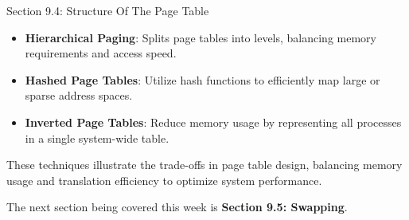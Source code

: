\begin{notes}{Section 9.4: Structure Of The Page Table}
\begin{highlight}
    \end{highlight}

    \begin{highlight}

        \begin{itemize}
            \item \textbf{Hierarchical Paging}: Splits page tables into levels, balancing memory requirements and access speed.
            \item \textbf{Hashed Page Tables}: Utilize hash functions to efficiently map large or sparse address spaces.
            \item \textbf{Inverted Page Tables}: Reduce memory usage by representing all processes in a single system-wide table.
        \end{itemize}

    These techniques illustrate the trade-offs in page table design, balancing memory usage and translation efficiency to optimize system performance.

    \end{highlight}
\end{notes}

The next section being covered this week is \textbf{Section 9.5: Swapping}.

